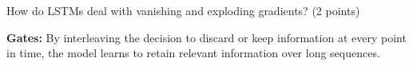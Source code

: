How do LSTMs deal with vanishing and exploding gradients? (2 points)

\begin{tcolorbox}

\textbf{Gates:} By interleaving the decision to discard or keep information at every point in time, the model learns to retain relevant information over long sequences.

\end{tcolorbox}

